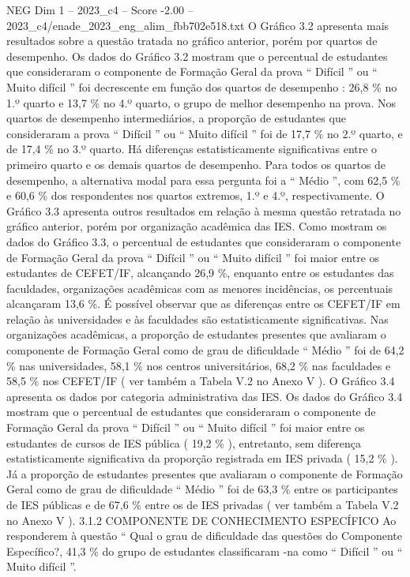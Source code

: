 \begin{textsample}{NEG Dim 1 – 2023\_c4 – Score -2.00 – 2023\_c4/enade\_2023\_eng\_alim\_fbb702e518.txt}
O Gráfico 3.2 apresenta mais resultados sobre a questão tratada no gráfico anterior, porém por quartos de desempenho.
Os dados do Gráfico 3.2 mostram que o percentual de estudantes que consideraram o componente de Formação Geral da prova “ Difícil ” ou “ Muito difícil ” foi decrescente em função dos quartos de desempenho : 26,8 \% no 1.º quarto e 13,7 \% no 4.º quarto, o grupo de melhor desempenho na prova.
Nos quartos de desempenho intermediários, a proporção de estudantes que consideraram a prova “ Difícil ” ou “ Muito difícil ” foi de 17,7 \% no 2.º quarto, e de 17,4 \% no 3.º quarto.
Há diferenças estatisticamente significativas entre o primeiro quarto e os demais quartos de desempenho.
Para todos os quartos de desempenho, a alternativa modal para essa pergunta foi a “ Médio ”, com 62,5 \% e 60,6 \% dos respondentes nos quartos extremos, 1.º e 4.º, respectivamente.
O Gráfico 3.3 apresenta outros resultados em relação à mesma questão retratada no gráfico anterior, porém por organização acadêmica das IES.
Como mostram os dados do Gráfico 3.3, o percentual de estudantes que consideraram o componente de Formação Geral da prova “ Difícil ” ou “ Muito difícil ” foi maior entre os estudantes de CEFET/IF, alcançando 26,9 \%, enquanto entre os estudantes das faculdades, organizações acadêmicas com as menores incidências, os percentuais alcançaram 13,6 \%.
É possível observar que as diferenças entre os CEFET/IF em relação às universidades e às faculdades são estatisticamente significativas.
Nas organizações acadêmicas, a proporção de estudantes presentes que avaliaram o componente de Formação Geral como de grau de dificuldade “ Médio ” foi de 64,2 \% nas universidades, 58,1 \% nos centros universitários, 68,2 \% nas faculdades e 58,5 \% nos CEFET/IF ( ver também a Tabela V.2 no Anexo V ).
O Gráfico 3.4 apresenta os dados por categoria administrativa das IES.
Os dados do Gráfico 3.4 mostram que o percentual de estudantes que consideraram o componente de Formação Geral da prova “ Difícil ” ou “ Muito difícil ” foi maior entre os estudantes de cursos de IES pública ( 19,2 \% ), entretanto, sem diferença estatisticamente significativa da proporção registrada em IES privada ( 15,2 \% ).
Já a proporção de estudantes presentes que avaliaram o componente de Formação Geral como de grau de dificuldade “ Médio ” foi de 63,3 \% entre os participantes de IES públicas e de 67,6 \% entre os de IES privadas ( ver também a Tabela V.2 no Anexo V ). 3.1.2 COMPONENTE DE CONHECIMENTO ESPECÍFICO Ao responderem à questão “ Qual o grau de dificuldade das questões do Componente Específico?, 41,3 \% do grupo de estudantes classificaram -na como “ Difícil ” ou “ Muito difícil ”.

\end{textsample}
